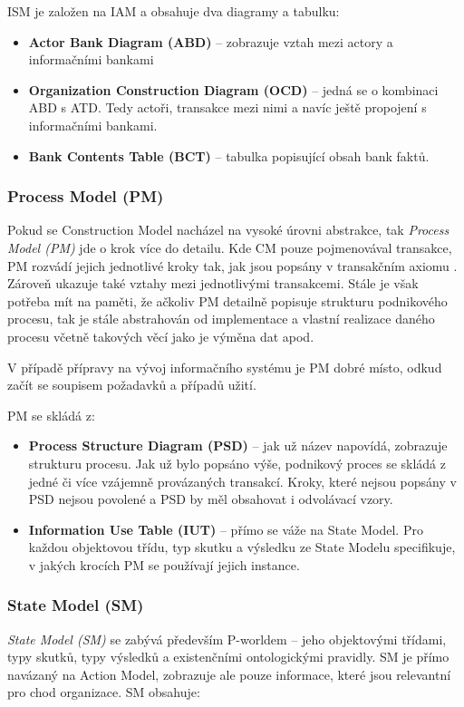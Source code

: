 ISM je založen na IAM a obsahuje dva diagramy a tabulku:

\begin{itemize}
\item \textbf{Actor Bank Diagram (ABD)} – zobrazuje vztah mezi actory a informačními bankami
\item \textbf{Organization Construction Diagram (OCD)} – jedná se o kombinaci ABD s ATD. Tedy actoři, transakce mezi nimi a navíc ještě propojení s informačními bankami.
\item \textbf{Bank Contents Table (BCT)} – tabulka popisující obsah bank faktů.
\end{itemize}

\subsubsection{Process Model (PM)}
Pokud se Construction Model nacházel na vysoké úrovni abstrakce, tak \textit{Process Model (PM)} jde o krok více do detailu. Kde CM pouze pojmenovával transakce, PM rozvádí jejich jednotlivé kroky tak, jak jsou popsány v transakčním axiomu \ptheory. Zároveň ukazuje také vztahy mezi jednotlivými transakcemi. Stále je však potřeba mít na paměti, že ačkoliv PM detailně popisuje strukturu podnikového procesu, tak je stále abstrahován od implementace a vlastní realizace daného procesu včetně takových věcí jako je výměna dat apod.

V případě přípravy na vývoj informačního systému je PM dobré místo, odkud začít se soupisem požadavků a případů užití.


PM se skládá z:

\begin{itemize}
\item \textbf{Process Structure Diagram (PSD)} – jak už název napovídá, zobrazuje strukturu procesu. Jak už bylo popsáno výše, podnikový proces se skládá z jedné či více vzájemně provázaných transakcí. Kroky, které nejsou popsány v PSD nejsou povolené a PSD by měl obsahovat i odvolávací vzory.
\item \textbf{Information Use Table (IUT)} – přímo se váže na State Model. Pro každou objektovou třídu, typ skutku a výsledku ze State Modelu specifikuje, v jakých krocích PM se používají jejich instance. 
\end{itemize}

\subsubsection{State Model (SM)}
\textit{State Model (SM)} se zabývá především P-worldem – jeho objektovými třídami, typy skutků, typy výsledků a existenčními ontologickými pravidly. SM je přímo navázaný na Action Model, zobrazuje ale pouze informace, které jsou relevantní pro chod organizace. SM obsahuje:


